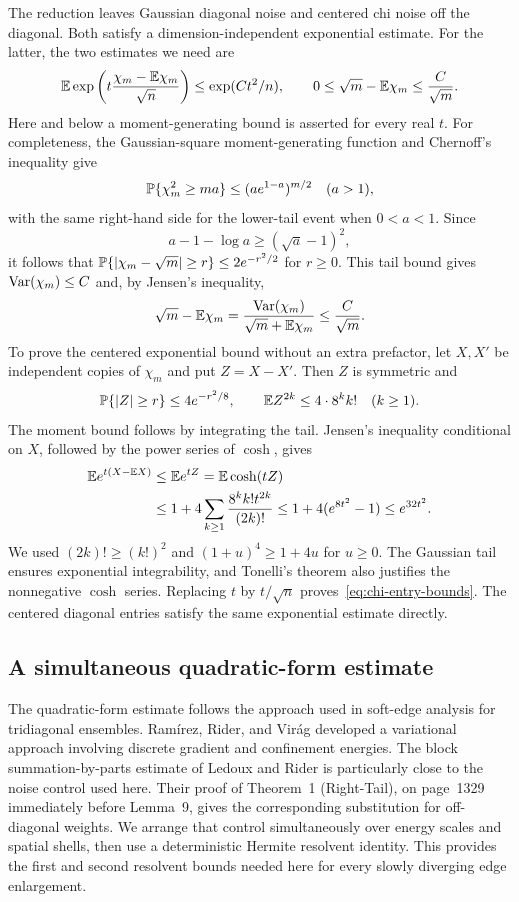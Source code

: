 The reduction leaves Gaussian diagonal noise and centered chi noise
off the diagonal. Both satisfy a dimension-independent exponential
estimate. For the latter, the two estimates we need are
\begin{equation}
 \mathbb E\exp\left(t\frac{\chi_m-\mathbb E\chi_m}{\sqrt n}\right)
 \le \exp(Ct^2/n),\qquad
 0\le\sqrt m-\mathbb E\chi_m\le\frac C{\sqrt m}.
 \label{eq:chi-entry-bounds}
\end{equation}
Here and below a moment-generating bound is asserted for every real $t$.
For completeness, the Gaussian-square moment-generating function and
Chernoff's inequality give
\[
 \mathbb P\{\chi_m^2\ge ma\}\le(ae^{1-a})^{m/2}
 \quad(a>1),
\]
with the same right-hand side for the lower-tail event when $0<a<1$.
Since
\[
 a-1-\log a\ge(\sqrt a-1)^2,
\]
it follows that
$\mathbb P\{|\chi_m-\sqrt m|\ge r\}\le2e^{-r^2/2}$ for $r\ge0$.
This tail bound gives $\operatorname{Var}(\chi_m)\le C$ and, by Jensen's inequality,
\[
 \sqrt m-\mathbb E\chi_m
 =\frac{\operatorname{Var}(\chi_m)}{\sqrt m+\mathbb E\chi_m}\le\frac C{\sqrt m}.
\]
To prove the centered exponential bound without an extra prefactor, let
$X,X'$ be independent copies of $\chi_m$ and put $Z=X-X'$.  Then $Z$ is
symmetric and
\[
 \mathbb P\{|Z|\ge r\}\le4e^{-r^2/8},\qquad
 \mathbb E Z^{2k}\le4\cdot8^k k!\quad(k\ge1).
\]
The moment bound follows by integrating the tail.  Jensen's inequality
conditional on $X$, followed by the power series of $\cosh$, gives
\[
\begin{aligned}
 \mathbb E e^{t(X-\mathbb E X)}
 &\le\mathbb E e^{tZ}=\mathbb E\cosh(tZ)\\
 &\le1+4\sum_{k\ge1}\frac{8^k k!t^{2k}}{(2k)!}
 \le1+4(e^{8t^2}-1)\le e^{32t^2}.
\end{aligned}
\]
We used $(2k)!\ge(k!)^2$ and $(1+u)^4\ge1+4u$ for $u\ge0$.
The Gaussian tail ensures exponential integrability, and Tonelli's theorem
also justifies the nonnegative $\cosh$ series.  Replacing $t$ by
$t/\sqrt n$ proves~\eqref{eq:chi-entry-bounds}.  The centered diagonal
entries satisfy the same exponential estimate directly.

\subsection{A simultaneous quadratic-form estimate}

The quadratic-form estimate follows the approach used in soft-edge analysis for
tridiagonal ensembles. Ram\'irez, Rider, and Vir\'ag
\cite{ramirezRiderVirag2011} developed a variational approach involving
discrete gradient and confinement energies. The block summation-by-parts
estimate of Ledoux and Rider \cite[Proposition~7 and Lemma~8]{ledouxRider2010}
is particularly close to the noise control used here. Their proof of
Theorem~1 (Right-Tail), on page~1329 immediately before Lemma~9, gives
the corresponding substitution for off-diagonal weights. We arrange that control simultaneously
over energy scales and spatial shells, then use a deterministic Hermite
resolvent identity. This provides the first and second resolvent bounds
needed here for every slowly diverging edge enlargement.

